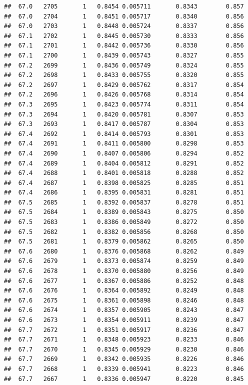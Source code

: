 \documentclass[
]{book}
\begin{document}
\begin{verbatim}
##  67.0   2705       1   0.8454 0.005711       0.8343        0.857
##  67.0   2704       1   0.8451 0.005717       0.8340        0.856
##  67.0   2703       1   0.8448 0.005724       0.8337        0.856
##  67.1   2702       1   0.8445 0.005730       0.8333        0.856
##  67.1   2701       1   0.8442 0.005736       0.8330        0.856
##  67.1   2700       1   0.8439 0.005743       0.8327        0.855
##  67.2   2699       1   0.8436 0.005749       0.8324        0.855
##  67.2   2698       1   0.8433 0.005755       0.8320        0.855
##  67.2   2697       1   0.8429 0.005762       0.8317        0.854
##  67.2   2696       1   0.8426 0.005768       0.8314        0.854
##  67.3   2695       1   0.8423 0.005774       0.8311        0.854
##  67.3   2694       1   0.8420 0.005781       0.8307        0.853
##  67.3   2693       1   0.8417 0.005787       0.8304        0.853
##  67.4   2692       1   0.8414 0.005793       0.8301        0.853
##  67.4   2691       1   0.8411 0.005800       0.8298        0.853
##  67.4   2690       1   0.8407 0.005806       0.8294        0.852
##  67.4   2689       1   0.8404 0.005812       0.8291        0.852
##  67.4   2688       1   0.8401 0.005818       0.8288        0.852
##  67.4   2687       1   0.8398 0.005825       0.8285        0.851
##  67.4   2686       1   0.8395 0.005831       0.8281        0.851
##  67.5   2685       1   0.8392 0.005837       0.8278        0.851
##  67.5   2684       1   0.8389 0.005843       0.8275        0.850
##  67.5   2683       1   0.8386 0.005849       0.8272        0.850
##  67.5   2682       1   0.8382 0.005856       0.8268        0.850
##  67.5   2681       1   0.8379 0.005862       0.8265        0.850
##  67.6   2680       1   0.8376 0.005868       0.8262        0.849
##  67.6   2679       1   0.8373 0.005874       0.8259        0.849
##  67.6   2678       1   0.8370 0.005880       0.8256        0.849
##  67.6   2677       1   0.8367 0.005886       0.8252        0.848
##  67.6   2676       1   0.8364 0.005892       0.8249        0.848
##  67.6   2675       1   0.8361 0.005898       0.8246        0.848
##  67.6   2674       1   0.8357 0.005905       0.8243        0.847
##  67.6   2673       1   0.8354 0.005911       0.8239        0.847
##  67.7   2672       1   0.8351 0.005917       0.8236        0.847
##  67.7   2671       1   0.8348 0.005923       0.8233        0.846
##  67.7   2670       1   0.8345 0.005929       0.8230        0.846
##  67.7   2669       1   0.8342 0.005935       0.8226        0.846
##  67.7   2668       1   0.8339 0.005941       0.8223        0.846
##  67.7   2667       1   0.8336 0.005947       0.8220        0.845

\end{verbatim}
\end{document}
